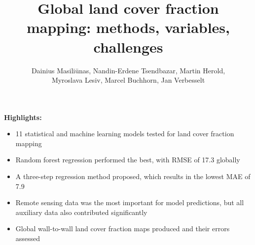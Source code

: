 \documentclass[a4paper,10pt]{article}
\title{Global land cover fraction mapping: methods, variables, challenges}
\author{Dainius Masiliūnas, Nandin-Erdene Tsendbazar, Martin Herold, \\ Myroslava Lesiv, Marcel Buchhorn, Jan Verbesselt}
\newcommand{\minisection}[1]{\medskip \textbf{#1:}}
\begin{document}
\maketitle

\linenumbers

\minisection{Highlights}

\begin{itemize}
    \item 11 statistical and machine learning models tested for land cover fraction mapping
    \item Random forest regression performed the best, with RMSE of 17.3 globally
    \item A three-step regression method proposed, which results in the lowest MAE of 7.9
    \item Remote sensing data was the most important for model predictions, but all auxiliary data also contributed significantly
    \item Global wall-to-wall land cover fraction maps produced and their errors assessed
\end{itemize}
\end{document}
